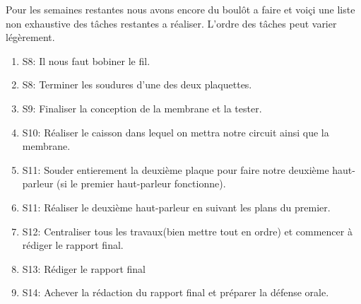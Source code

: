Pour les semaines restantes nous avons encore du boulôt a faire et voiçi une liste non exhaustive des tâches restantes a réaliser.
L'ordre des tâches peut varier légèrement.
\begin{enumerate}
\item{S8}: Il nous faut bobiner le fil.
\item{S8}: Terminer les soudures d'une des deux plaquettes.
\item{S9}: Finaliser la conception de la membrane et la tester.
\item{S10}: Réaliser le caisson dans lequel on mettra notre circuit ainsi que la membrane.
\item{S11}: Souder entierement la deuxième plaque pour faire notre deuxième haut-parleur (si le premier haut-parleur fonctionne).
\item{S11}: Réaliser le deuxième haut-parleur en suivant les plans du premier.
\item{S12}: Centraliser tous les travaux(bien mettre tout en ordre) et commencer à rédiger le rapport final.
\item{S13}: Rédiger le rapport final
\item{S14}: Achever la rédaction du rapport final et préparer la défense orale.
\end{enumerate}




